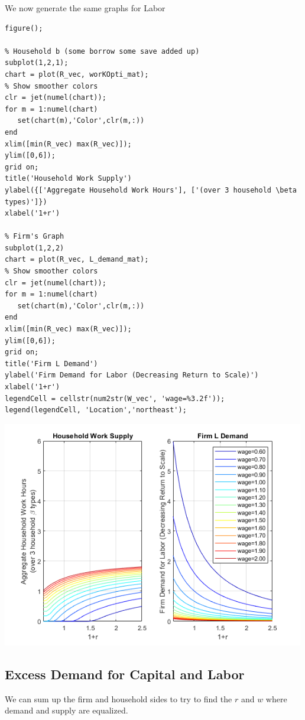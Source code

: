 \documentclass[
]{book}
\begin{document}
We now generate the same graphs for Labor

\begin{verbatim}
figure();

% Household b (some borrow some save added up)
subplot(1,2,1);
chart = plot(R_vec, worKOpti_mat);
% Show smoother colors
clr = jet(numel(chart));
for m = 1:numel(chart)
   set(chart(m),'Color',clr(m,:))
end
xlim([min(R_vec) max(R_vec)]);
ylim([0,6]);
grid on;
title('Household Work Supply')
ylabel({['Aggregate Household Work Hours'], ['(over 3 household \beta types)']})
xlabel('1+r')

% Firm's Graph
subplot(1,2,2)
chart = plot(R_vec, L_demand_mat);
% Show smoother colors
clr = jet(numel(chart));
for m = 1:numel(chart)
   set(chart(m),'Color',clr(m,:))
end
xlim([min(R_vec) max(R_vec)]);
ylim([0,6]);
grid on;
title('Firm L Demand')
ylabel('Firm Demand for Labor (Decreasing Return to Scale)')
xlabel('1+r')
legendCell = cellstr(num2str(W_vec', 'wage=%3.2f'));
legend(legendCell, 'Location','northeast');
\end{verbatim}

\includegraphics[width=5.20833in,height=\textheight]{img/equilibrium_constrainedborrow_labor_images/figure_1.png}

\hypertarget{excess-demand-for-capital-and-labor}{%
\subsection{Excess Demand for Capital and Labor}\label{excess-demand-for-capital-and-labor}}

We can sum up the firm and household sides to try to find the \(r\) and
\(w\) where demand and supply are equalized.
\end{document}
